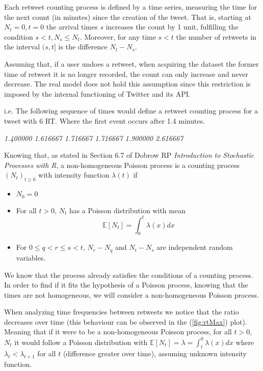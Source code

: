 \documentclass[11pt, a4paper]{article}
\begin{document}
Each retweet counting process is defined by a time series, measuring the time for the next count (in minutes) since the creation of the tweet. 
That is, starting at $N_t=0, t=0$ the arrival times $s$ increases the count by 1 unit, fulfilling the condition $s<t, N_s \leq N_t$. Moreover, for any time $s<t$ the number of retweets in the interval $(s, t]$ is the difference $N_t -N_s$. 

Assuming that, if a user undoes a retweet, when acquiring the dataset the former time of retweet it is no longer recorded, the count can only increase and never decrease. 
The real model does not hold this assumption since this restriction is imposed by the internal functioning of Twitter and its API. 

i.e. The following sequence of times would define a retweet counting process for a tweet with 6 RT. 
Where the first event occurs after 1.4 minutes.

\begin{center}
	\textit{1.400000    1.616667    1.716667    1.716667    1.900000    2.616667}
\end{center}

Knowing that, as stated in Section 6.7 of Dobrow RP \textit{Introduction to Stochastic Processes with R}, a non-homogeneous Poisson process is a counting process $(N_t)_{t\geq0}$ with intensity function $\lambda(t)$ if
\begin{itemize}
	\item $N_0 = 0$ 
	\item For all $t>0$, $N_t$ has a Poisson distribution with mean
	\[\mathbb{E}[N_t] = \int^t_0\lambda(x)dx\]
	\item For $0\leq q < r \leq s < t$, $N_r - N_q$ and $N_t - N_s$ are independent random variables.
\end{itemize}

We know that the process already satisfies the conditions of a counting process. In order to find if it fits the hypothesis of a Poisson process, knowing that the times are not homogeneous, we will consider a non-homogeneous Poisson process.

When analyzing time frequencies between retweets we notice that the ratio decreases over time (this behaviour can be observed in the (\ref{fig:rtMax}) plot). Meaning that if it were to be a non-homogeneous Poisson process, for all $t>0$, $N_t$ it would follow a Poisson distribution with $\mathbb{E}[N_t] = \lambda = \int_{t}^{0} \lambda(x)dx$ where $\lambda_t < \lambda_{t+1}$ for all $t$ (difference greater over time), assuming unknown intensity function.
\end{document}
